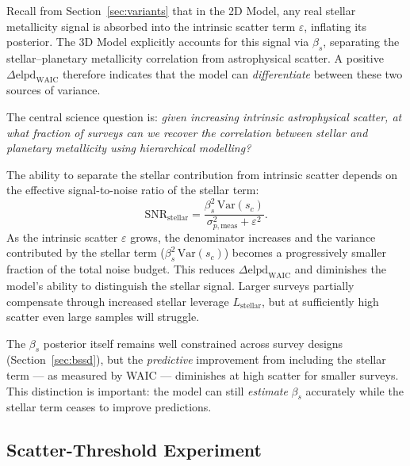 \documentclass[twocolumn]{aastex631}
\begin{document}
Recall from Section~\ref{sec:variants} that in the 2D Model, any
real stellar metallicity signal is absorbed into the intrinsic scatter
term $\varepsilon$, inflating its posterior. The 3D Model explicitly
accounts for this signal via $\beta_s$, separating the
stellar--planetary metallicity correlation from astrophysical scatter.
A positive $\Delta\mathrm{elpd}_{\mathrm{WAIC}}$ therefore
indicates that the model can \emph{differentiate} between these two
sources of variance.

The central science question is: \emph{given increasing intrinsic
astrophysical scatter, at what fraction of surveys can we recover the
correlation between stellar and planetary metallicity using
hierarchical modelling?}

The ability to separate the stellar contribution from intrinsic
scatter depends on the effective signal-to-noise ratio of the stellar
term:
%
\begin{equation}\label{eq:stellar_snr}
    \mathrm{SNR}_{\mathrm{stellar}}
    = \frac{\beta_s^2\,\mathrm{Var}(s_c)}
           {\sigma_{p,\mathrm{meas}}^2 + \varepsilon^2}.
\end{equation}
%
As the intrinsic scatter $\varepsilon$ grows, the denominator
increases and the variance contributed by the stellar term
($\beta_s^2\,\mathrm{Var}(s_c)$) becomes a progressively smaller
fraction of the total noise budget. This reduces
$\Delta\mathrm{elpd}_{\mathrm{WAIC}}$ and diminishes the model's
ability to distinguish the stellar signal. Larger surveys partially
compensate through increased stellar leverage
$L_{\mathrm{stellar}}$, but at sufficiently high scatter even large
samples will struggle.

The $\beta_s$ posterior itself remains well constrained across survey
designs (Section~\ref{sec:bssd}), but the \emph{predictive}
improvement from including the stellar term --- as measured by WAIC
--- diminishes at high scatter for smaller surveys. This distinction
is important: the model can still \emph{estimate} $\beta_s$
accurately while the stellar term ceases to improve predictions.

\subsection{Scatter-Threshold Experiment}\label{sec:scatter_threshold}
\end{document}
